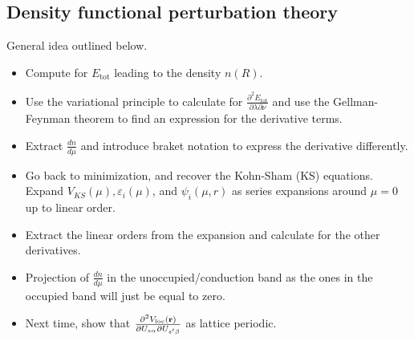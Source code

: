 \subsection{Density functional perturbation theory}
General idea outlined below. 
\begin{itemize}
    \item Compute for $E_\text{tot}$ leading to the density $n(R)$.
    \item Use the variational principle to calculate for $\frac{\partial^2E_\text{tot}}{\partial\lambda \partial\nu}$ and use the Gellman-Feynman theorem to find an expression for the derivative terms. 
    \item Extract $\frac{dn}{d\mu}$  and introduce braket notation to express the derivative differently.
    \item Go back to minimization, and recover the Kohn-Sham (KS) equations. Expand $V_{KS}(\mu),\varepsilon_i(\mu)$, and $\psi_i(\mu,r)$ as series expansions around $\mu=0$ up to linear order.
    \item Extract the linear orders from the expansion and calculate for the other derivatives. 
    \item Projection of $\frac{dn}{d\mu}$ in the unoccupied/conduction band as the ones in the occupied band will just be equal to zero. 
    \item Next time, show that $\frac{\partial^2V_\text{loc}(\mathbf{r})}{\partial U_{s\alpha}\partial U_{s'\beta}}$ as lattice periodic. 
\end{itemize}